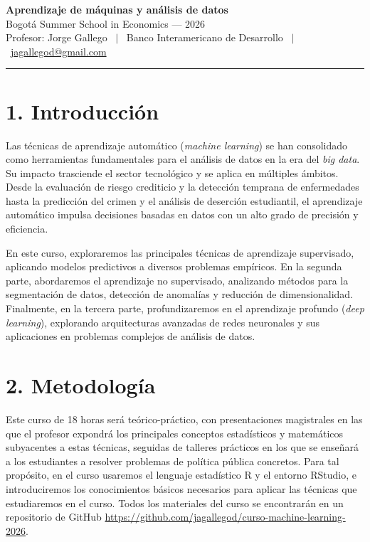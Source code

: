 \documentclass[11pt]{article}
\begin{document}
\thispagestyle{empty}

\begin{center}
{\large\bfseries Aprendizaje de máquinas y análisis de datos}\\[4pt]
Bogotá Summer School in Economics --- 2026\\[3pt]
Profesor: Jorge Gallego \ $|$ \ Banco Interamericano de Desarrollo \ $|$ \ \href{mailto:jagallegod@gmail.com}{jagallegod@gmail.com}
\end{center}

\vspace{4pt}
\hrule
\vspace{10pt}

\section*{1. Introducción}

Las técnicas de aprendizaje automático (\textit{machine learning}) se han consolidado como herramientas fundamentales para el análisis de datos en la era del \textit{big data}. Su impacto trasciende el sector tecnológico y se aplica en múltiples ámbitos. Desde la evaluación de riesgo crediticio y la detección temprana de enfermedades hasta la predicción del crimen y el análisis de deserción estudiantil, el aprendizaje automático impulsa decisiones basadas en datos con un alto grado de precisión y eficiencia.

En este curso, exploraremos las principales técnicas de aprendizaje supervisado, aplicando modelos predictivos a diversos problemas empíricos. En la segunda parte, abordaremos el aprendizaje no supervisado, analizando métodos para la segmentación de datos, detección de anomalías y reducción de dimensionalidad. Finalmente, en la tercera parte, profundizaremos en el aprendizaje profundo (\textit{deep learning}), explorando arquitecturas avanzadas de redes neuronales y sus aplicaciones en problemas complejos de análisis de datos.

\section*{2. Metodología}

Este curso de 18 horas será teórico-práctico, con presentaciones magistrales en las que el profesor expondrá los principales conceptos estadísticos y matemáticos subyacentes a estas técnicas, seguidas de talleres prácticos en los que se enseñará a los estudiantes a resolver problemas de política pública concretos. Para tal propósito, en el curso usaremos el lenguaje estadístico R y el entorno RStudio, e introduciremos los conocimientos básicos necesarios para aplicar las técnicas que estudiaremos en el curso. Todos los materiales del curso se encontrarán en un repositorio de GitHub \url{https://github.com/jagallegod/curso-machine-learning-2026}.
\end{document}
